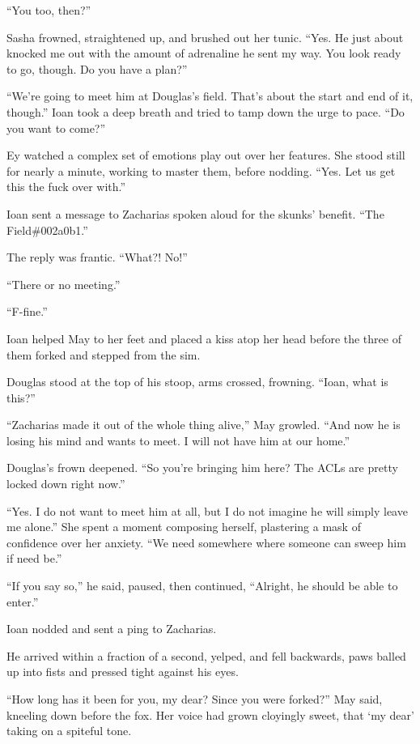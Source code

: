``You too, then?''

Sasha frowned, straightened up, and brushed out her tunic. ``Yes. He just about knocked me out with the amount of adrenaline he sent my way. You look ready to go, though. Do you have a plan?''

``We're going to meet him at Douglas's field. That's about the start and end of it, though.'' Ioan took a deep breath and tried to tamp down the urge to pace. ``Do you want to come?''

Ey watched a complex set of emotions play out over her features. She stood still for nearly a minute, working to master them, before nodding. ``Yes. Let us get this the fuck over with.''

Ioan sent a message to Zacharias spoken aloud for the skunks' benefit. ``The Field\#002a0b1.''

The reply was frantic. ``What?! No!''

``There or no meeting.''

``F-fine.''

Ioan helped May to her feet and placed a kiss atop her head before the three of them forked and stepped from the sim.

Douglas stood at the top of his stoop, arms crossed, frowning. ``Ioan, what is this?''

``Zacharias made it out of the whole thing alive,'' May growled. ``And now he is losing his mind and wants to meet. I will not have him at our home.''

Douglas's frown deepened. ``So you're bringing him here? The ACLs are pretty locked down right now.''

``Yes. I do not want to meet him at all, but I do not imagine he will simply leave me alone.'' She spent a moment composing herself, plastering a mask of confidence over her anxiety. ``We need somewhere where someone can sweep him if need be.''

``If you say so,'' he said, paused, then continued, ``Alright, he should be able to enter.''

Ioan nodded and sent a ping to Zacharias.

He arrived within a fraction of a second, yelped, and fell backwards, paws balled up into fists and pressed tight against his eyes.

``How long has it been for you, my dear? Since you were forked?'' May said, kneeling down before the fox. Her voice had grown cloyingly sweet, that `my dear' taking on a spiteful tone.

